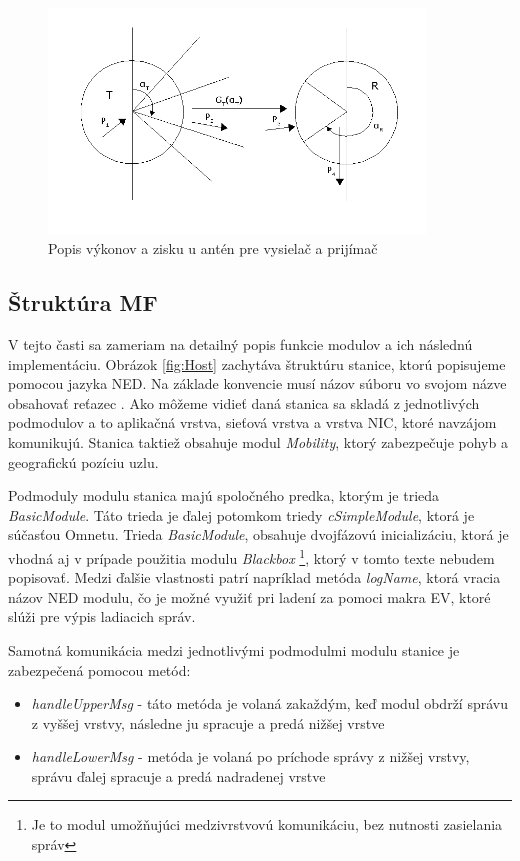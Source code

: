 \documentclass[11pt,twoside,a4paper]{book}
\begin{document}
\begin{figure}[htbp]
 \centering
 \includegraphics[width=10cm]{./figures/FSPL.png}
 \caption{Popis výkonov a zisku u antén pre vysielač a prijímač}
 \label{fig:FSPL}
\end{figure}


\subsection{Štruktúra MF}
V tejto časti sa zameriam na detailný popis funkcie modulov a ich následnú implementáciu. Obrázok \ref{fig:Host} zachytáva štruktúru stanice, ktorú popisujeme pomocou jazyka NED. Na základe konvencie musí názov súboru vo svojom názve obsahovať reťazec . Ako môžeme vidieť daná stanica sa skladá z jednotlivých podmodulov a to aplikačná vrstva, sieťová vrstva a vrstva NIC, ktoré navzájom komunikujú. Stanica taktiež obsahuje modul \textit{Mobility}, ktorý zabezpečuje pohyb a geografickú pozíciu uzlu. 

Podmoduly modulu stanica majú spoločného predka, ktorým je trieda \textit{BasicModule}. Táto trieda je ďalej potomkom triedy \textit{cSimpleModule}, ktorá je súčasťou Omnetu. Trieda \textit{BasicModule}, obsahuje dvojfázovú inicializáciu, ktorá je vhodná aj v prípade použitia modulu \textit{Blackbox} \footnote{Je to modul umožňujúci medzivrstvovú komunikáciu, bez nutnosti zasielania správ}, ktorý v tomto texte nebudem popisovať. Medzi ďalšie vlastnosti patrí napríklad metóda \textit{logName}, ktorá vracia názov NED modulu, čo je možné využiť pri ladení za pomoci makra EV, ktoré slúži pre výpis ladiacich správ. 

Samotná komunikácia medzi jednotlivými podmodulmi modulu stanice je zabezpečená pomocou metód:
\begin{itemize}
 \item \textit{handleUpperMsg} - táto metóda je volaná zakaždým, keď modul obdrží správu z vyššej vrstvy, následne ju spracuje a predá nižšej vrstve
 \item \textit{handleLowerMsg} - metóda je volaná po príchode správy z nižšej vrstvy, správu ďalej spracuje a predá nadradenej vrstve
\end{itemize}
\end{document}

